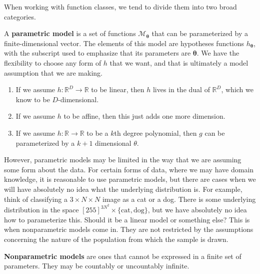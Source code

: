 \documentclass{article}
\begin{document}
    When working with function classes, we tend to divide them into two broad categories. 

    \begin{definition}
      A \textbf{parametric model} is a set of functions $\mathcal{M}_{\boldsymbol{\theta}}$ that can be parameterized by a finite-dimensional vector. The elements of this model are hypotheses functions $h_{\boldsymbol{\theta}}$, with the subscript used to emphasize that its parameters are $\boldsymbol{\theta}$. We have the flexibility to choose any form of $h$ that we want, and that is ultimately a model assumption that we are making. 
    \end{definition}

    \begin{example}
      \begin{enumerate}
        \item If we assume $h: \mathbb{R}^D \rightarrow \mathbb{R}$ to be linear, then $h$ lives in the dual of $\mathbb{R}^D$, which we know to be $D$-dimensional. 
        \item If we assume $h$ to be affine, then this just adds one more dimension. 
        \item If we assume $h: \mathbb{R} \rightarrow \mathbb{R}$ to be a $k$th degree polynomial, then $g$ can be parameterized by a $k+1$ dimensional $\theta$. 
      \end{enumerate}
    \end{example}

    However, parametric models may be limited in the way that we are assuming some form about the data. For certain forms of data, where we may have domain knowledge, it is reasonable to use parametric models, but there are cases when we will have absolutely no idea what the underlying distribution is. For example, think of classifying a $3 \times N \times N$ image as a cat or a dog. There is some underlying distribution in the space $[255]^{3 N^2} \times \{\text{cat}, \text{dog}\}$, but we have absolutely no idea how to parameterize this. Should it be a linear model or something else? This is when nonparametric models come in. They are not restricted by the assumptions concerning the nature of the population from which the sample is drawn. 

    \begin{definition}
      \textbf{Nonparametric models} are ones that cannot be expressed in a finite set of parameters. They may be countably or uncountably infinite. 
    \end{definition}
\end{document}
